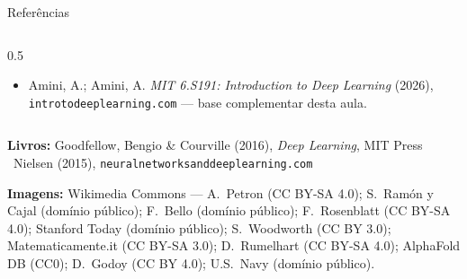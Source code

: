 \documentclass[aspectratio=169, 11pt]{beamer}
\begin{document}
\begin{frame}{Referências}
\begin{columns}[T]
\begin{column}{0.5\textwidth}
{\begin{itemize}
              (S26), Lecs.\ 1--2 — \texttt{deeplearning.cs.cmu.edu}
        \item Amini, A.; Amini, A. \emph{MIT 6.S191: Introduction to Deep
              Learning} (2026), \texttt{introtodeeplearning.com} — base
              complementar desta aula.
      \end{itemize}}
    \end{column}
  \end{columns}
  \smallskip
  \vspace{-0.3em}
  {\scriptsize \textbf{Livros:} Goodfellow, Bengio \& Courville (2016),
  \emph{Deep Learning}, MIT Press \textbullet\ Nielsen (2015),
  \texttt{neuralnetworksanddeeplearning.com}\par
  \textbf{Imagens:} Wikimedia Commons — A.\ Petron (CC BY-SA 4.0); S.\ Ramón
  y Cajal (domínio público); F.\ Bello (domínio público); F.\ Rosenblatt
  (CC BY-SA 4.0); Stanford Today (domínio público); S.\ Woodworth (CC BY 3.0);
  Matematicamente.it (CC BY-SA 3.0); D.\ Rumelhart (CC BY-SA 4.0); AlphaFold
  DB (CC0); D.\ Godoy (CC BY 4.0); U.S.\ Navy (domínio público).\par}
\end{frame}
\end{document}
